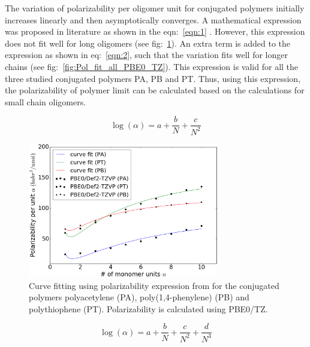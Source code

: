 The variation of polarizability per oligomer unit for conjugated polymers initially increases linearly and then asymptotically converges. A mathematical expression was proposed in literature as shown in the eqn:\ \ref{eqn:1} \cite{Hurst1988}. However, this expression does not fit well for long oligomers (see fig:\ \ref{fig:Pol_fit_all_PBE0_TZ_old}). An extra term is added to the expression as shown in eq:\ \ref{eqn:2}, such that the variation fits well for longer chains (see fig:\ \ref{fig:Pol_fit_all_PBE0_TZ}). This expression is valid for all the three studied conjugated polymers PA, PB and PT. Thus, using this expression, the polarizability of polymer limit can be calculated based on the calculations for small chain oligomers. 

\begin{equation} \label{eqn:1}
\log(\alpha)=a+\frac{b}{N}+\frac{c}{N^2}
\end{equation}


\begin{figure}[htbp] 
	\centering
	\includegraphics[width=0.744\textwidth]{Chapter-3/Figures/Pol_fit_all_PBE0_TZ_old.eps}
	\caption{Curve fitting using polarizability expression from \cite{Hurst1988} for the conjugated polymers polyacetylene (PA), poly(1,4-phenylene) (PB) and polythiophene (PT). Polarizability is calculated using PBE0/TZ.} 
	\label{fig:Pol_fit_all_PBE0_TZ_old} 
\end{figure}  


\begin{equation} \label{eqn:2}
\log(\alpha)=a+\frac{b}{N}+\frac{c}{N^2}+\frac{d}{N^3}
\end{equation}



